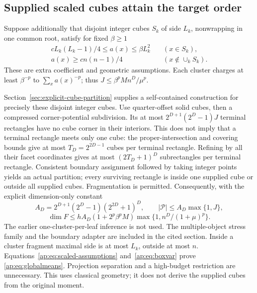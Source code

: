 \documentclass[11pt]{article}
\begin{document}
\subsection{Supplied scaled cubes attain the target order}
Suppose additionally that disjoint integer cubes $S_k$ of side $L_k$,
nonwrapping in one common root, satisfy for fixed $\beta\geq1$
\begin{equation}\label{ap:eq:scaled-assumptions}
 \begin{split}
 cL_k(L_k-1)/4\leq a(x)\leq\beta L_k^2 &\quad(x\in S_k),\\
 a(x)\geq cn(n-1)/4 &\quad(x\notin\cup_k S_k).
 \end{split}
\end{equation}
These are extra coefficient and geometric assumptions. Each cluster charges
at least $\beta^{-p}$ to $\sum_xa(x)^{-p}$; thus
$J\leq\beta^p M n^D/\mu^p$.

Section~\ref{sec:explicit-cube-partition} supplies a self-contained construction
for precisely these disjoint integer cubes. Use quarter-offset solid cubes,
then a compressed corner-potential subdivision. Its at most
$2^{D+1}(2^D-1)J$ terminal rectangles have no cube corner in their interiors.
This does not imply that a terminal rectangle meets only one cube: the
proper-intersection and covering bounds give at most
$T_D=2^{2D-1}$ cubes per terminal rectangle. Refining by all their facet
coordinates gives at most $(2T_D+1)^D$ subrectangles per terminal rectangle.
Consistent boundary assignment followed by taking integer points yields an
actual partition; every surviving rectangle is inside one supplied cube
or outside all supplied cubes. Fragmentation is permitted. Consequently,
with the explicit dimension-only constant
\[
 A_D=2^{D+1}(2^D-1)(2^{2D}+1)^D,
 \qquad |\mathcal P|\leq A_D\max\{1,J\},
\]
\[
 \dim F\leq h A_D(1+2^p\beta^pM)\max\{1,n^D/(1+\mu)^p\}.
\]
The earlier one-cluster-per-leaf inference is not used. The multiple-object
stress family and the boundary adapter are included in the cited section.
Inside a cluster fragment maximal side is at most $L_k$, outside at most
$n$. Equations~\eqref{ap:eq:scaled-assumptions} and~\eqref{ap:eq:boxvar} prove
\eqref{ap:eq:globalmeans}. Projection separation and a high-budget restriction
are unnecessary. This uses classical geometry; it does not derive the
supplied cubes from the original moment.
\end{document}
